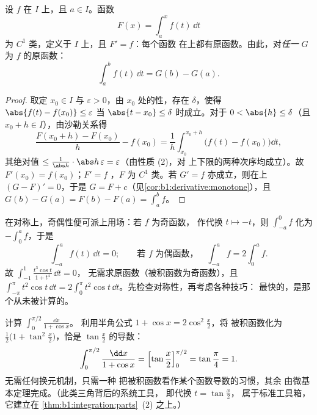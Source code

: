 \begin{theorem}[微积分基本定理]\label{thm:b1:integration:ftc}
设 $f$ 在 $I$ 上，且 $a \in I$。函数
\[
F(x) = \int_a^x f(t)\, \dd t
\]
为 $C^1$ 类，定义于 $I$ 上，且 $F' = f$：每个函数
在上都有原函数。由此，对\emph{任一}
$G$ 为 $f$ 的原函数：
\[
\int_a^b f(t)\,\dd t = G(b) - G(a) .
\]
\end{theorem}

\begin{proof}
取定 $x_0 \in I$ 与 $\varepsilon > 0$，由 $x_0$ 处的性，存在
$\delta$，使得 $\abs{f(t) - f(x_0)} \leq \varepsilon$ 当 $\abs{t -
x_0} \leq \delta$ 时成立。对于 $0 < \abs{h} \leq \delta$（且 $x_0 + h \in
I$），由沙勒关系得
\[
\frac{F(x_0 + h) - F(x_0)}{h} - f(x_0)
= \frac 1h \int_{x_0}^{x_0+h} \bigl(f(t) - f(x_0)\bigr)\dd t ,
\]
其绝对值 $\leq \frac{1}{\abs h}\cdot \abs h\,
\varepsilon = \varepsilon$（由性质 (2)，对
上下限的两种次序均成立）。故 $F'(x_0) = f(x_0)$；$F' = f$ ，$F$ 为
$C^1$ 类。若 $G' = f$ 亦成立，则在上 $(G - F)' = 0$，于是 $G =
F + c$（见\cref{cor:b1:derivative:monotone}），且 $G(b) - G(a) = F(b)
- F(a) = \int_a^b f$。
\end{proof}

\begin{example}[计算前先看对称性]\label{ex:b1:integration:parity}
在对称上，奇偶性便可派上用场：若 $f$ 为奇函数，
作代换 $t \mapsto -t$，则 $\int_{-a}^{0} f$ 化为
$-\int_0^a f$，于是
\[
\int_{-a}^{a} f(t)\,\dd t = 0 ;
\qquad\text{若 $f$ 为偶函数，}\quad
\int_{-a}^{a} f = 2\int_0^a f .
\]
故 $\int_{-1}^{1} \frac{t^3\cos t}{1 + t^4}\,\dd t = 0$，
无需求原函数（被积函数为奇函数），且
$\int_{-\pi}^{\pi} t^2\cos t\,\dd t = 2\int_0^\pi t^2\cos t\,
\dd t$。先检查对称性，再考虑各种技巧：
最快的，是那个从未被计算的。
\end{example}

\begin{example}[一眼识别导数]\label{ex:b1:integration:halfangle}
计算 $\displaystyle\int_0^{\pi/2} \frac{\dd x}{1 + \cos x}$。
利用半角公式 $1 + \cos x = 2\cos^2\frac x2$，将
被积函数化为 $\frac{1}{2}\bigl(1 + \tan^2\frac
x2\bigr)$，恰是 $\tan\frac x2$ 的导数：
\[
\int_0^{\pi/2} \frac{\dd x}{1 + \cos x}
= \Bigl[\tan\frac x2\Bigr]_0^{\pi/2} = \tan\frac\pi4 = 1 .
\]
无需任何换元机制，只需一种
把被积函数看作某个函数导数的习惯，其余
由微基本定理完成。（此类三角背后的系统工具，
即代换 $t = \tan\frac x2$，
属于标准工具箱，它建立在
\cref{thm:b1:integration:parts}~(2) 之上。）
\end{example}

